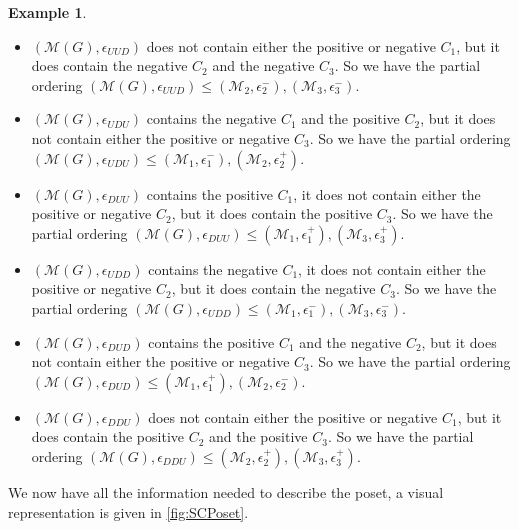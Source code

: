 \documentclass[12pt]{report}
\theoremstyle{definition}
\newtheorem{example}[theorem]{Example}
\def\calM{\mathcal M}
\theoremstyle{upright}
\begin{document}
\begin{example}
    \begin{itemize}
        \item $(\calM(G), \epsilon_{UUD})$ does not contain either the positive or negative $C_1$, but it does contain the negative $C_2$ and the negative $C_3$.
        So we have the partial ordering $(\calM(G), \epsilon_{UUD})\leq(\calM_2, \epsilon_2^-), (\calM_3, \epsilon_3^-)$.
        \item $(\calM(G), \epsilon_{UDU})$ contains the negative $C_1$ and the positive $C_2$, but it does not contain either the positive or negative $C_3$.
        So we have the partial ordering $(\calM(G), \epsilon_{UDU})\leq(\calM_1, \epsilon_1^-), (\calM_2, \epsilon_2^+)$.
        \item $(\calM(G), \epsilon_{DUU})$ contains the positive $C_1$, it does not contain either the positive or negative $C_2$, but it does contain the positive $C_3$.
        So we have the partial ordering $(\calM(G), \epsilon_{DUU})\leq(\calM_1, \epsilon_1^+), (\calM_3, \epsilon_3^+)$.
        \item $(\calM(G), \epsilon_{UDD})$ contains the negative $C_1$, it does not contain either the positive or negative $C_2$, but it does contain the negative $C_3$.
        So we have the partial ordering $(\calM(G), \epsilon_{UDD})\leq(\calM_1, \epsilon_1^-), (\calM_3, \epsilon_3^-)$.
        \item $(\calM(G), \epsilon_{DUD})$ contains the positive $C_1$ and the negative $C_2$, but it does not contain either the positive or negative $C_3$.
        So we have the partial ordering $(\calM(G), \epsilon_{DUD})\leq(\calM_1, \epsilon_1^+), (\calM_2, \epsilon_2^-)$.
        \item $(\calM(G), \epsilon_{DDU})$ does not contain either the positive or negative $C_1$, but it does contain the positive $C_2$ and the positive $C_3$.
        So we have the partial ordering $(\calM(G), \epsilon_{DDU})\leq(\calM_2, \epsilon_2^+), (\calM_3, \epsilon_3^+)$.
    \end{itemize}

    We now have all the information needed to describe the poset, a visual representation is given in \cref{fig:SCPoset}.

    \begin{figure}[htbp]

        \begin{center}

            \begin{tikzcd}[scale cd=0.75, column sep=tiny]
            

\end{tikzcd}
\end{center}
\end{figure}
\end{example}
\end{document}
